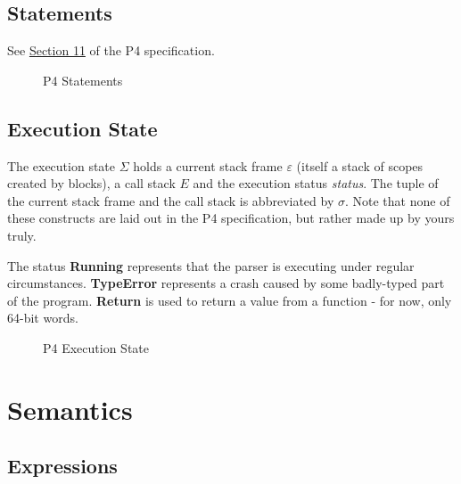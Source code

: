\documentclass[UTF8]{article}
\begin{document}
\subsection{Statements}
See \href{https://p4.org/p4-spec/docs/P4-16-v1.2.1.html#sec-stmts}{Section 11} of the P4 specification.

%
\begin{figure}[h!]
\centering\ottgrammartabular{
\ottstmt\ottafterlastrule
}
\caption{P4 Statements}
\label{fig:stmt}
\end{figure}

\newpage
\newcommand{\state}{\Sigma}
\newcommand{\stacks}{\sigma}
\newcommand{\currsf}{\varepsilon}
\newcommand{\cstack}{E}
\newcommand{\status}{\textit{status}}
\subsection{Execution State}
The execution state $\state{}$ holds a current stack frame $\currsf$ (itself a stack of scopes created by blocks), a call stack $\cstack$ and the execution status \status{}. The tuple of the current stack frame and the call stack is abbreviated by $\stacks{}$. Note that none of these constructs are laid out in the P4 specification, but rather made up by yours truly.

The status \textbf{Running} represents that the parser is executing under regular circumstances. \textbf{TypeError} represents a crash caused by some badly-typed part of the program. \textbf{Return} is used to return a value from a function - for now, only 64-bit words.

\begin{figure}[h!]
\centering\ottgrammartabular{
\ottstatus\ottinterrule
\ottstate\ottafterlastrule
}
\caption{P4 Execution State}
\label{fig:status}
\end{figure}

\section{Semantics}
\subsection{Expressions}
\end{document}
